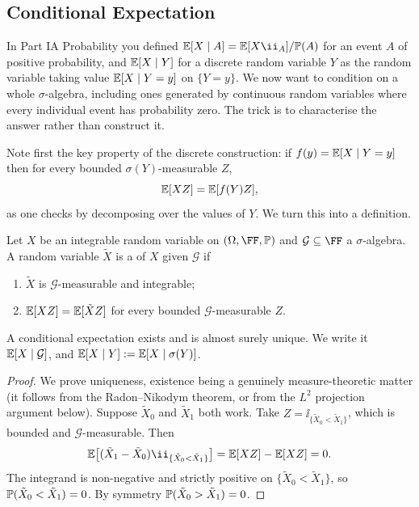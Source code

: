 \documentclass[a4paper]{scrartcl}
\begin{document}
\subsection{Conditional Expectation}

In Part IA Probability you defined $\EE[X \mid A] = \EE[X\ii_A]/\PP(A)$ for an event $A$ of positive probability, and $\mathbb{E}[X \mid Y]$ for a discrete random variable $Y$ as the random variable taking value $\mathbb{E}[X \mid Y = y]$ on $\{Y = y\}$. We now want to condition on a whole $\sigma$-algebra, including ones generated by continuous random variables where every individual event has probability zero. The trick is to characterise the answer rather than construct it.

Note first the key property of the discrete construction: if $f(y) = \mathbb{E}[X \mid Y=y]$ then for every bounded $\sigma(Y)$-measurable $Z$,
$$
\mathbb{E}[XZ] = \mathbb{E}[f(Y)Z],
$$
as one checks by decomposing over the values of $Y$. We turn this into a definition.

\begin{definition}
	Let $X$ be an integrable random variable on $(\Omega,\FF,\PP)$ and $\mathcal{G}\subseteq \FF$ a $\sigma$-algebra. A random variable $\tilde X$ is a  of $X$ given $\mathcal{G}$ if
	\begin{enumerate}[label=(\roman*)]
		\item $\tilde X$ is $\mathcal{G}$-measurable and integrable;
		\item $\mathbb{E}[XZ] = \mathbb{E}[\tilde X Z]$ for every bounded $\mathcal{G}$-measurable $Z$.
	\end{enumerate}
\end{definition}

\begin{proposition}
	A conditional expectation exists and is almost surely unique. We write it $\mathbb{E}[X \mid \mathcal{G}]$, and $\mathbb{E}[X\mid Y] := \mathbb{E}[X \mid \sigma(Y)]$.
\end{proposition}

\begin{proof}
	We prove uniqueness, existence being a genuinely measure-theoretic matter (it follows from the Radon--Nikodym theorem, or from the $L^2$ projection argument below). Suppose $\tilde X_0$ and $\tilde X_1$ both work. Take $Z = \ii_{\{\tilde X_0 < \tilde X_1\}}$, which is bounded and $\mathcal{G}$-measurable. Then
	$$
	\EE\big[(\tilde X_1 - \tilde X_0)\ii_{\{\tilde X_0 < \tilde X_1\}}\big] = \EE[XZ] - \EE[XZ] = 0.
	$$
	The integrand is non-negative and strictly positive on $\{\tilde X_0 < \tilde X_1\}$, so $\mathbb{P}(\tilde X_0 < \tilde X_1) = 0$. By symmetry $\mathbb{P}(\tilde X_0 > \tilde X_1) = 0$.
\end{proof}
\end{document}
